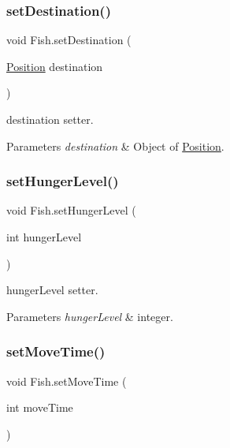 \subsubsection{\texorpdfstring{set\+Destination()}{setDestination()}}
{\footnotesize\ttfamily void Fish.\+set\+Destination (\begin{DoxyParamCaption}\item[{\mbox{\hyperlink{class_position}{Position}}}]{destination }\end{DoxyParamCaption})\hspace{0.3cm}{\ttfamily [inline]}}

destination setter. 
\begin{DoxyParams}{Parameters}
{\em destination} & Object of \mbox{\hyperlink{class_position}{Position}}. \\
\hline
\end{DoxyParams}
\mbox{\label{class_fish_a95e9975f718a7a24254bcbb58dfe1ba1}} 
\subsubsection{\texorpdfstring{set\+Hunger\+Level()}{setHungerLevel()}}
{\footnotesize\ttfamily void Fish.\+set\+Hunger\+Level (\begin{DoxyParamCaption}\item[{int}]{hunger\+Level }\end{DoxyParamCaption})\hspace{0.3cm}{\ttfamily [inline]}}

hunger\+Level setter. 
\begin{DoxyParams}{Parameters}
{\em hunger\+Level} & integer. \\
\hline
\end{DoxyParams}
\mbox{\label{class_fish_ad6d23a97f4d4f6916243cf0033470e87}} 
\subsubsection{\texorpdfstring{set\+Move\+Time()}{setMoveTime()}}
{\footnotesize\ttfamily void Fish.\+set\+Move\+Time (\begin{DoxyParamCaption}\item[{int}]{move\+Time }\end{DoxyParamCaption})\hspace{0.3cm}{\ttfamily [inline]}}

